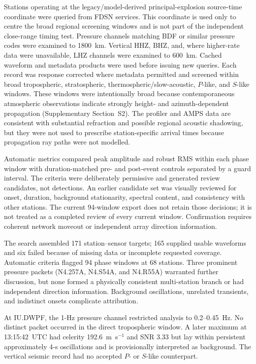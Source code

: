 \documentclass[]{seismica}
\begin{document}
Stations operating at the legacy/model-derived principal-explosion source-time coordinate were queried from
FDSN services. This coordinate is used only to centre the broad regional screening windows and is not part of the independent close-range timing test. Pressure channels matching BDF or similar pressure codes were
examined to 1800~km. Vertical HHZ, BHZ, and, where higher-rate data were
unavailable, LHZ channels were examined to 600~km. Cached waveform and metadata
products were used before issuing new queries. Each record was response
corrected where metadata permitted and screened within broad tropospheric,
stratospheric, thermospheric/slow-acoustic, $P$-like, and $S$-like windows.
These windows were intentionally broad because contemporaneous atmospheric
observations indicate strongly height- and azimuth-dependent propagation
(Supplementary Section~S2). The profiler and AMPS data are consistent with
substantial refraction and possible regional acoustic shadowing, but they were
not used to prescribe station-specific arrival times because propagation ray
paths were not modelled.

Automatic metrics compared peak amplitude and robust RMS within each phase
window with duration-matched pre- and post-event controls separated by a guard
interval. The criteria were deliberately permissive and generated review
candidates, not detections. An earlier candidate set was visually reviewed for onset, duration, background
stationarity, spectral content, and consistency with other stations. The current
94-window export does not retain those decisions; it is not treated as a
completed review of every current window. Confirmation requires coherent network
moveout or independent array direction information.

The search assembled 171 station--sensor targets; 165 supplied usable
waveforms and six failed because of missing data or incomplete requested
coverage. Automatic criteria flagged 94 phase windows at 68 stations. Three
prominent pressure packets (N4.257A, N4.S54A, and N4.R55A) warranted further
discussion, but none formed a physically consistent multi-station branch or
had independent direction information. Background oscillations, unrelated
transients, and indistinct onsets complicate attribution.

At IU.DWPF, the 1-Hz pressure channel restricted analysis to 0.2--0.45~Hz. No
distinct packet occurred in the direct tropospheric window. A later maximum at
13:15:42~UTC had celerity 192.6~m~s$^{-1}$ and SNR 3.33 but lay within
persistent approximately 4-s oscillations and is provisionally interpreted as background. The
vertical seismic record had no accepted $P$- or $S$-like counterpart.
\end{document}
